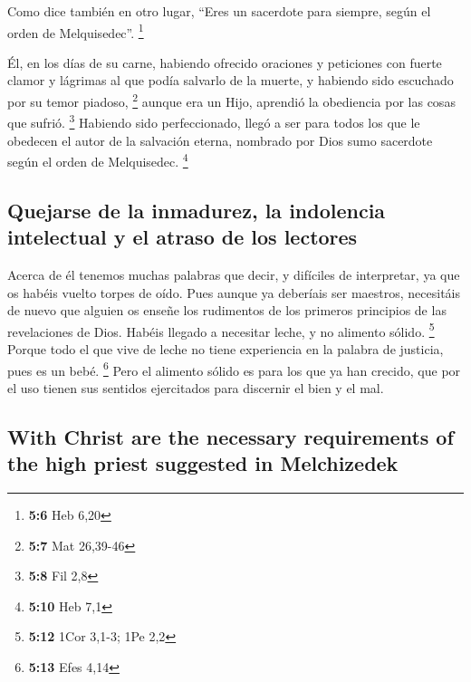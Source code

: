 \begin{paracol}{2}
 Como dice también en otro lugar, ``Eres un sacerdote para
siempre, según el orden de Melquisedec''. \footnote{\textbf{5:6} Heb
  6,20}

 Él, en los días de su carne, habiendo ofrecido oraciones
y peticiones con fuerte clamor y lágrimas al que podía salvarlo de la
muerte, y habiendo sido escuchado por su temor piadoso, \footnote{\textbf{5:7}
  Mat 26,39-46}  aunque era un Hijo, aprendió la
obediencia por las cosas que sufrió. \footnote{\textbf{5:8} Fil 2,8}
 Habiendo sido perfeccionado, llegó a ser para todos los
que le obedecen el autor de la salvación eterna, 
nombrado por Dios sumo sacerdote según el orden de Melquisedec.
\footnote{\textbf{5:10} Heb 7,1}

\hypertarget{quejarse-de-la-inmadurez-la-indolencia-intelectual-y-el-atraso-de-los-lectores}{%
\subsection{Quejarse de la inmadurez, la indolencia intelectual y el
atraso de los
lectores}\label{quejarse-de-la-inmadurez-la-indolencia-intelectual-y-el-atraso-de-los-lectores}}

 Acerca de él tenemos muchas palabras que decir, y
difíciles de interpretar, ya que os habéis vuelto torpes de oído.
 Pues aunque ya deberíais ser maestros, necesitáis de
nuevo que alguien os enseñe los rudimentos de los primeros principios de
las revelaciones de Dios. Habéis llegado a necesitar leche, y no
alimento sólido. \footnote{\textbf{5:12} 1Cor 3,1-3; 1Pe 2,2}
 Porque todo el que vive de leche no tiene experiencia en
la palabra de justicia, pues es un bebé. \footnote{\textbf{5:13} Efes
  4,14}  Pero el alimento sólido es para los que ya han
crecido, que por el uso tienen sus sentidos ejercitados para discernir
el bien y el mal.

\switchcolumn
\begin{otherlanguage}{english}

\hypertarget{with-christ-are-the-necessary-requirements-of-the-high-priest-suggested-in-melchizedek}{%
\subsection{With Christ are the necessary requirements of the high
priest suggested in
Melchizedek}\label{with-christ-are-the-necessary-requirements-of-the-high-priest-suggested-in-melchizedek}}


\end{otherlanguage}
\end{paracol}

